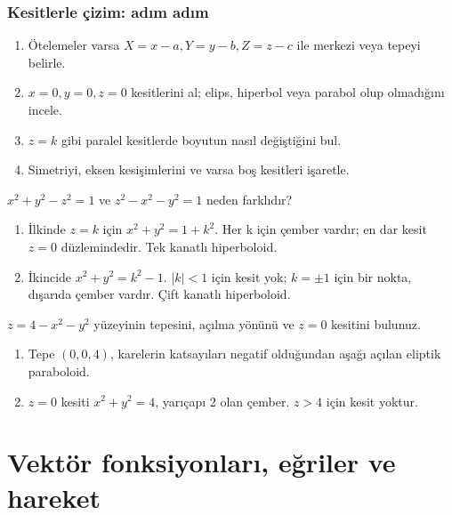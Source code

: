 \section{Kesitlerle çizim: adım adım}
\begin{enumerate}
\item Ötelemeler varsa \(X=x-a,Y=y-b,Z=z-c\) ile merkezi veya tepeyi belirle.
\item \(x=0,y=0,z=0\) kesitlerini al; elips, hiperbol veya parabol olup olmadığını incele.
\item \(z=k\) gibi paralel kesitlerde boyutun nasıl değiştiğini bul.
\item Simetriyi, eksen kesişimlerini ve varsa boş kesitleri işaretle.
\end{enumerate}
\begin{tcolorbox}[title={Örnek 2.16 | İki yüzeyin kesitlerini karşılaştır},colframe=accent]\(x^2+y^2-z^2=1\) ve \(z^2-x^2-y^2=1\) neden farklıdır?
\par\vspace{1mm}{\scriptsize\sffamily Pekiştirme}\end{tcolorbox}
\begin{tcolorbox}[title={Adım adım çözüm},colback=green!3!white,colframe=green]\begin{enumerate}
\item İlkinde \(z=k\) için \(x^2+y^2=1+k^2\). Her k için çember vardır; en dar kesit \(z=0\) düzlemindedir. Tek kanatlı hiperboloid.
\item İkincide \(x^2+y^2=k^2-1\). \(|k|<1\) için kesit yok; \(k=\pm1\) için bir nokta, dışarıda çember vardır. Çift kanatlı hiperboloid.
\end{enumerate}\end{tcolorbox}
\begin{tcolorbox}[title={Örnek 2.17 | Pekiştirme: yüzeyi tanı},colframe=accent]\(z=4-x^2-y^2\) yüzeyinin tepesini, açılma yönünü ve \(z=0\) kesitini bulunuz.
\par\vspace{1mm}{\scriptsize\sffamily Pekiştirme}\end{tcolorbox}
\begin{tcolorbox}[title={Adım adım çözüm},colback=green!3!white,colframe=green]\begin{enumerate}
\item Tepe \((0,0,4)\), karelerin katsayıları negatif olduğundan aşağı açılan eliptik paraboloid.
\item \(z=0\) kesiti \(x^2+y^2=4\), yarıçapı 2 olan çember. \(z>4\) için kesit yoktur.
\end{enumerate}\end{tcolorbox}
\clearpage\part{Vektör fonksiyonları, eğriler ve hareket}
